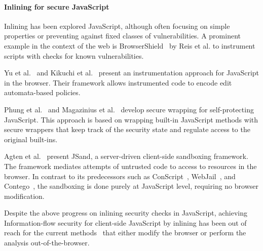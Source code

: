 \documentclass{llncs}
\begin{document}
\paragraph{Inlining for secure JavaScript}
Inlining has been explored JavaScript, although often focusing on
simple properties or preventing against fixed classes of vulnerabilities.
A prominent example in the context of the web is
BrowserShield~\cite{Reis+:TWeb07} by Reis et al. to instrument scripts with
checks for known vulnerabilities.

Yu et al.~\cite{Yu+:POPL07} and Kikuchi et
al.~\cite{DBLP:conf/aplas/2008} present an instrumentation approach
for JavaScript in the browser. Their framework allows instrumented
code to encode edit automata-based policies.

Phung et al.~\cite{DBLP:conf/ccs/PhungSC09} and 
Magazinius et al.~\cite{DBLP:conf/nordsec/MagaziniusPS10} develop
secure wrapping for self-protecting JavaScript. This approach is based
on wrapping built-in JavaScript methods with secure wrappers that
keep track of the security state and regulate access to the original built-ins.  



Agten et al.~\cite{DBLP:conf/acsac/AgtenABPDP12} present JSand, a
server-driven client-side sandboxing framework. The framework mediates
attempts of untrusted code to access to resources in the browser.  
In contrast to its predecessors such as
ConScript~\cite{DBLP:conf/sp/MeyerovichL10}, WebJail~\cite{DBLP:conf/acsac/AckerRDPJ11}, and Contego~\cite{DBLP:conf/trust/LuoD11},
the sandboxing is done purely at JavaScript level, requiring no
browser modification.

Despite the above progress on inlining security checks in JavaScript, achieving
Information-flow security for client-side JavaScript by inlining has been out of
reach for the current methods~\cite{Vogt+:NDSS07,DBLP:conf/pldi/ChughMJL09,Yip:Narula:Krohn:Morris:EUROSYS09,Jang+:CCS10,DeGroef+:CCS12}  that either
modify the browser or perform the analysis out-of-the-browser.

\end{document}
